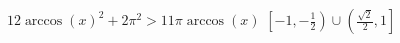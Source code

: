 { $12 \arccos(x)^2+2\pi^2>11\pi \arccos(x)$ }
{ $\left[-1, -\frac{1}{2}\right) \cup \left( \frac{\sqrt{2}}{2}, 1\right]$}
